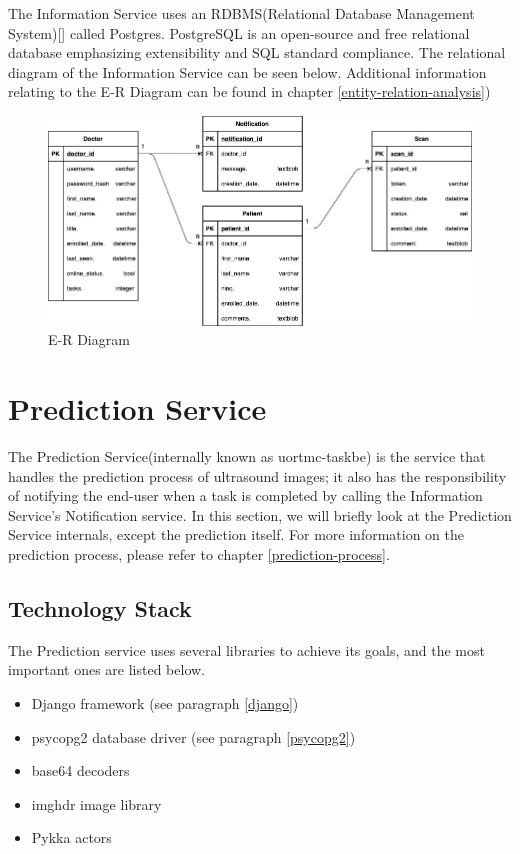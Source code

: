 			The Information Service uses an RDBMS(Relational Database Management System)[\cite{friedrichsen_ruffolo_monk_starks_pratt_last_1995}] called Postgres. PostgreSQL is an open-source and free 
			relational database emphasizing extensibility and SQL standard compliance. The relational diagram of the Information Service can be 
			seen below. Additional information relating to the E-R Diagram can be found in chapter \ref{entity-relation-analysis})\pagebreak
			\begin{figure}[H]
				\iftrue
				\caption{E-R Diagram}
				\centering
				\includegraphics[angle=90,origin=c,scale=0.8]{figures/InformationServiceDatabaseDiagram}
				\fi
			\end{figure}\pagebreak
	
	\section{Prediction Service}
		The Prediction Service(internally known as uortmc-taskbe) is the service that handles the prediction process of ultrasound 
		images; it also has the responsibility of notifying the end-user when a task is completed by calling the Information Service's 
		Notification service. In this section, we will briefly look at the Prediction Service internals, except the prediction itself. 
		For more information on the prediction process, please refer to chapter \ref{prediction-process}.
		\subsection{Technology Stack}
			The Prediction service uses several libraries to achieve its goals, and the most important ones are listed below.
			\begin{itemize}
				\item Django framework (see paragraph \ref{django})
				\item psycopg2 database driver (see paragraph \ref{psycopg2})
				\item base64 decoders
				\item imghdr image library
				\item Pykka actors
			\end{itemize}
